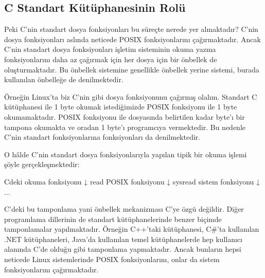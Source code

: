 \documentclass[a4paper,10pt,turkish]{sphinxmanual}
\begin{document}
\subsection{C Standart Kütüphanesinin Rolü}
\label{\detokenize{filesystem1:c-standart-kutuphanesinin-rolu}}
\sphinxAtStartPar
Peki C’nin standart dosya fonksiyonları bu süreçte nerede yer almaktadır? C’nin dosya fonksiyonları
aslında neticede POSIX fonksiyonlarını çağırmaktadır. Ancak C’nin standart dosya fonksiyonları
işletim sisteminin okuma yazma fonksiyonlarını daha az çağırmak için  her dosya için bir önbellek de oluşturmaktadır. Bu önbellek sistemine genellikle önbellek
yerine  sistemi, burada kullanılan önbelleğe de 
denilmektedir.

\sphinxAtStartPar
Örneğin Linux’ta biz C’nin  gibi dosya fonksiyonunu çağırmış olalım. Standart C
kütüphanesi  ile 1 byte okumak istediğimizde  POSIX fonksiyonu ile 1 byte
okumamaktadır.  POSIX fonksiyonu ile  dosyasında belirtilen  kadar
byte’ı bir tampona okumakta ve oradan 1 byte’ı programcıya vermektedir. Bu nedenle C’nin standart
fonksiyonlarına  fonksiyonları da denilmektedir.

\sphinxAtStartPar
O hâlde C’nin standart dosya fonksiyonlarıyla yapılan tipik bir okuma işlemi şöyle
gerçekleşmektedir:

\begin{sphinxVerbatim}[commandchars=\\\{\}]
C\PYGZsq{}deki okuma fonksiyonu
      ↓
read POSIX fonksiyonu
      ↓
sys\PYGZus{}read sistem fonksiyonu
      ↓
...
\end{sphinxVerbatim}

\sphinxAtStartPar
C’deki bu tamponlama yani önbellek mekanizması C’ye özgü değildir. Diğer programlama dillerinin
de standart kütüphanelerinde benzer biçimde tamponlamalar yapılmaktadır. Örneğin C++’taki
 kütüphanesi, C\#’ta kullanılan .NET kütüphaneleri, Java’da kullanılan temel
kütüphanelerde hep kullanıcı alanında C’de olduğu gibi tamponlama yapmaktadır. Ancak bunların
hepsi neticede Linux sistemlerinde POSIX fonksiyonlarını, onlar da sistem fonksiyonlarını
çağırmaktadır.
\end{document}
